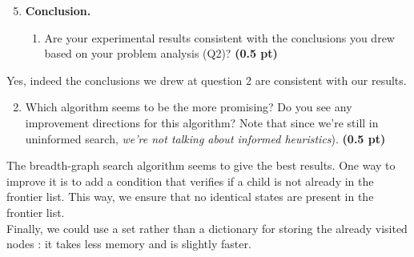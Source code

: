 \documentclass[11pt,a4paper]{report}
\begin{document}
\begin{enumerate}
	\setcounter{enumi}{4}
	\item \textbf{Conclusion.}
	\begin{enumerate}
		\item Are your experimental results consistent with the conclusions you drew
		based on your problem analysis (Q2)? \textbf{(0.5 pt)}
	\end{enumerate}
\end{enumerate}
\begin{answers}[4cm]
 Yes, indeed the conclusions we drew at question 2 are consistent with our results.
\end{answers}

\begin{enumerate}
	\setcounter{enumi}{4}
	\begin{enumerate}
		\setcounter{enumii}{1}
		\item Which algorithm seems to be the more promising? Do you see any improvement directions for this algorithm? Note that since we're still in uninformed search, \textit{we're not talking about informed heuristics}). \textbf{(0.5 pt)}
	\end{enumerate}
\end{enumerate}
\begin{answers}[4cm]
 The breadth-graph search algorithm seems to give the best results.
 One way to improve it is to add a condition that verifies if a child is not already in the frontier list.
 This way, we ensure that no identical states are present in the frontier list.\\
 Finally, we could use a set rather than a dictionary for storing the already visited nodes : it takes less memory and is slightly faster.
\end{answers}
\end{document}
